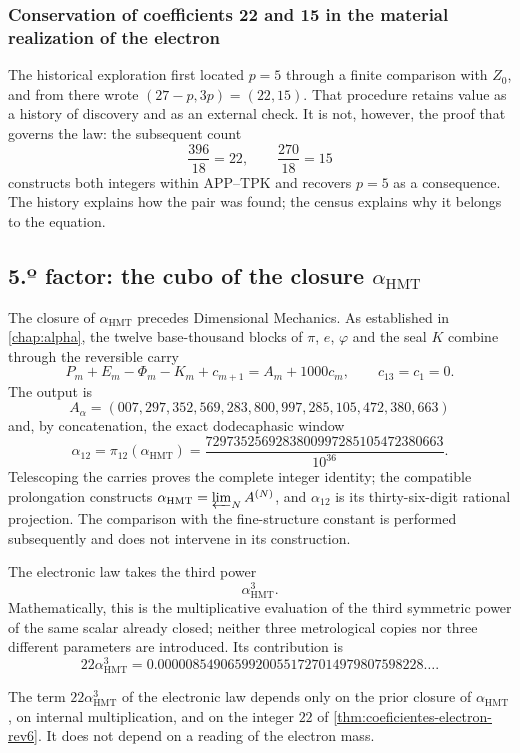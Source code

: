 \subsubsection{Conservation of coefficients 22 and 15 in the material realization of the electron}

The historical exploration first located \(p=5\) through a finite
comparison with \(Z_0\), and from there wrote
\((27-p,3p)=(22,15)\). That procedure retains value as a history of
discovery and as an external check. It is not, however, the proof
that governs the law: the subsequent count
\[
 \frac{396}{18}=22,
 \qquad
 \frac{270}{18}=15
\]
constructs both integers within APP--TPK and recovers \(p=5\) as a
consequence. The history explains how the pair was found; the census
explains why it belongs to the equation.

\subsection{5.º factor: the cubo of the closure \(\alpha_{\mathrm{HMT}}\)}

The closure of \(\alpha_{\mathrm{HMT}}\) precedes Dimensional Mechanics.
As established in \cref{chap:alpha}, the twelve base-thousand blocks
of \(\pi\), \(e\), \(\varphi\) and the seal \(K\) combine through the
reversible carry
\[
 P_m+E_m-\Phi_m-K_m+c_{m+1}
 =A_m+1000c_m,
 \qquad c_{13}=c_1=0.
\]
The output is
\[
 A_\alpha=
 (007,297,352,569,283,800,997,285,105,472,380,663)
\]
and, by concatenation, the exact dodecaphasic window
\[
 \alpha_{12}=\pi_{12}(\alpha_{\mathrm{HMT}})
 =
 \frac{
 7297352569283800997285105472380663
 }{10^{36}}.
\]
Telescoping the carries proves the complete integer identity; the
compatible prolongation constructs
\(\alpha_{\mathrm{HMT}}=\varprojlim_N A^{(N)}\), and \(\alpha_{12}\) is its
thirty-six-digit rational projection. The
comparison with the fine-structure constant is performed subsequently and does not
intervene in its construction.

The electronic law takes the third power
\[
 \alpha_{\mathrm{HMT}}^3.
\]
Mathematically, this is the multiplicative evaluation of the third
symmetric power of the same scalar already closed; neither three
metrological copies nor three different parameters are introduced. Its contribution is
\[
 22\alpha_{\mathrm{HMT}}^3
 =
 0.00000854906599200551727014979807598228\ldots.
\]

\begin{proposition}
\label{prop:alpha-cubica-electron-rev6}
The term \(22\alpha_{\mathrm{HMT}}^3\) of the electronic law depends
only on the prior closure of \(\alpha_{\mathrm{HMT}}\), on internal
multiplication, and on the integer \(22\) of
\cref{thm:coeficientes-electron-rev6}. It does not depend on a reading of the
electron mass.
\end{proposition}

